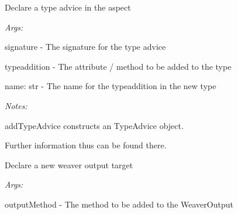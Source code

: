 \documentclass[letterpaper,10pt,english]{sphinxmanual}
\begin{document}
\begin{fulllineitems}
\begin{fulllineitems}
\end{fulllineitems}


\begin{fulllineitems}
\label{modules/index:aosb.core.Aspect.addTypeAdvice}
Declare a type advice in the aspect

\begin{DUlineblock}{0em}
\item[] \emph{Args:}
\item[]
\begin{DUlineblock}{\DUlineblockindent}
\item[] signature - The signature for the type advice
\item[] typeaddition - The attribute / method to be added to the type
\item[] name: str - The name for the typeaddition in the new type
\end{DUlineblock}
\end{DUlineblock}

\begin{DUlineblock}{0em}
\item[] \emph{Notes:}
\item[]
\begin{DUlineblock}{\DUlineblockindent}
\item[] addTypeAdvice constructs an TypeAdvice object.
\item[] Further information thus can be found there.
\end{DUlineblock}
\end{DUlineblock}

\end{fulllineitems}


\begin{fulllineitems}
\label{modules/index:aosb.core.Aspect.addWeaverOutput}
Declare a new weaver output target

\begin{DUlineblock}{0em}
\item[] \emph{Args:}
\item[]
\begin{DUlineblock}{\DUlineblockindent}
\item[] outputMethod - The method to be added to the WeaverOutput
\end{DUlineblock}
\end{DUlineblock}


\end{fulllineitems}
\end{fulllineitems}
\end{document}
